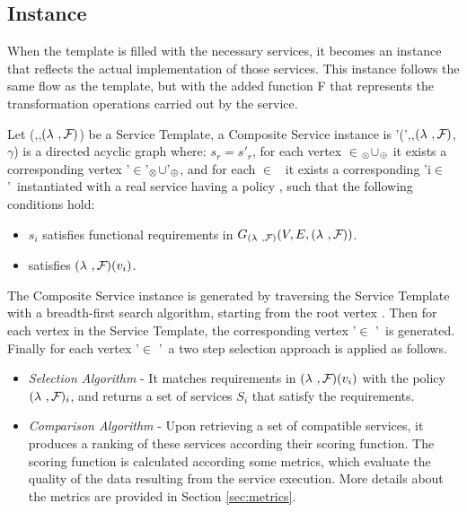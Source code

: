 \subsection{Instance}
When the template is filled with the necessary services, it becomes an instance that reflects the actual implementation of those services. This instance follows the same flow as the template, but with the added function F that represents the transformation operations carried out by the service.

Let \T(\V,\E,$(\lambda~,\mathcal{F}_{})$) be a Service Template, a Composite Service instance is \T'(\V',\E,$(\lambda~,\mathcal{F}_{})$,$\gamma$) is a directed acyclic graph where:
$s_r=s'_r$, for each vertex \vi{}$\in$\V$_{\otimes}$$\cup$\V$_{\oplus}$ it exists a corresponding vertex \vi{}'$\in$\V'$_{\otimes}$$\cup$\V'$_{\oplus}$,
    and for each $\in$ \V\ it exists a corresponding \vi'{i}$\in$ \V'\ instantiated with a real service  having a policy , such that the following conditions hold:
    \begin{itemize}
      \item $s_i$ satisfies functional requirements in $G_{(\lambda~,\mathcal{F}_{})}(V,E,(\lambda~,\mathcal{F}_{}))$.
      \item {} satisfies $(\lambda~,\mathcal{F}_{})(v_i)$.
    \end{itemize}

    The Composite Service  instance  is generated by traversing the Service Template with a breadth-first search algorithm,
    starting from the root vertex . Then for each vertex  in the Service Template, the corresponding vertex '$\in$ \V'\ is generated.
    Finally for each vertex  '$\in$ \V'\ a two step selection approach is applied as follows.
\begin{itemize}
  \item \textit{Selection Algorithm} - It matches requirements in $(\lambda~,\mathcal{F}_{})(v_i)$ with the policy $(\lambda~,\mathcal{F}_{})_i$, and returns a set of services $S_i$ that satisfy the requirements.
  \item \textit{Comparison Algorithm} - Upon retrieving a set of compatible services, it produces a ranking of these services according their scoring function.
        The scoring function is calculated according some metrics, which evaluate the quality of the data resulting from the service execution.
        More details about the metrics are provided in Section \ref{sec:metrics}.
\end{itemize}


